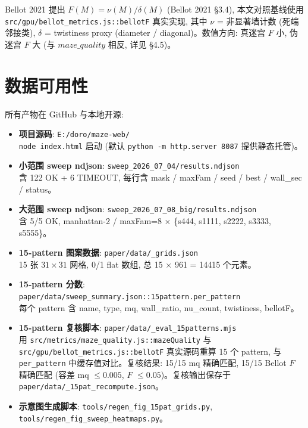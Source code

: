 Bellot 2021 提出 $F(M) = \nu(M) / \delta(M)$ (Bellot 2021 §3.4), 本文对照基线使用 \texttt{src/gpu/bellot\_metrics.js::bellotF} 真实实现, 其中 $\nu$ = 非显著墙计数 (死端邻接类), $\delta$ = twistiness proxy (diameter / diagonal)。数值方向: 真迷宫 $F$ 小, 伪迷宫 $F$ 大 (与 $maze\_quality$ 相反, 详见 §4.5)。

\section{数据可用性}
\label{sec:appendix-b}

所有产物在 GitHub 与本地开源:
\begin{itemize}[leftmargin=*, itemsep=2pt]
  \item \textbf{项目源码}: \texttt{E:/doro/maze-web/} \\
    \texttt{node index.html} 启动 (默认 \texttt{python -m http.server 8087} 提供静态托管)。
  \item \textbf{小范围 sweep ndjson}: \texttt{sweep\_2026\_07\_04/results.ndjson} \\
    含 122 OK + 6 TIMEOUT, 每行含 mask / maxFam / seed / best / wall\_sec / status。
  \item \textbf{大范围 sweep ndjson}: \texttt{sweep\_2026\_07\_08\_big/results.ndjson} \\
    含 5/5 OK, manhattan-2 / maxFam=8 × \{s444, s1111, s2222, s3333, s5555\}。
  \item \textbf{15-pattern 图案数据}: \texttt{paper/data/\_grids.json} \\
    15 张 $31 \times 31$ 网格, 0/1 flat 数组, 总 15 $\times$ 961 = 14415 个元素。
  \item \textbf{15-pattern 分数}: \texttt{paper/data/sweep\_summary.json::15pattern.per\_pattern} \\
    每个 pattern 含 name, type, mq, wall\_ratio, nu\_count, twistiness, bellotF。
  \item \textbf{15-pattern 复核脚本}: \texttt{paper/data/\_eval\_15patterns.mjs} \\
    用 \texttt{src/metrics/maze\_quality.js::mazeQuality} 与 \texttt{src/gpu/bellot\_metrics.js::bellotF} 真实源码重算 15 个 pattern, 与 \texttt{per\_pattern} 中缓存值对比。复核结果: 15/15 mq 精确匹配, 15/15 Bellot $F$ 精确匹配 (容差 mq $\le 0.005$, $F$ $\le 0.05$)。复核输出保存于 \texttt{paper/data/\_15pat\_recompute.json}。
  \item \textbf{示意图生成脚本}: \texttt{tools/regen\_fig\_15pat\_grids.py}, \texttt{tools/regen\_fig\_sweep\_heatmaps.py}。
\end{itemize}

